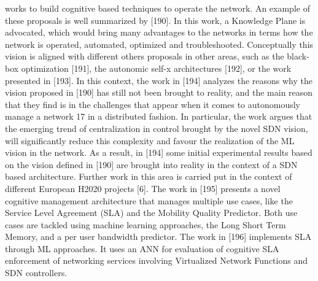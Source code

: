 \documentclass[12pt]{article}
\begin{document}
\begin{itemize}
	works to build cognitive based techniques to operate the
	network. An example of these proposals is well summarized
	by [190]. In this work, a Knowledge Plane is advocated, which
	would bring many advantages to the networks in terms how the
	network is operated, automated, optimized and troubleshooted.
	Conceptually this vision is aligned with different others proposals
	in other areas, such as the black-box optimization [191],
	the autonomic self-x architectures [192], or the work presented
	in [193]. In this context, the work in [194] analyzes the reasons
	why the vision proposed in [190] has still not been brought to
	reality, and the main reason that they find is in the challenges
	that appear when it comes to autonomously manage a network
	17
	in a distributed fashion. In particular, the work argues that
	the emerging trend of centralization in control brought by the
	novel SDN vision, will significantly reduce this complexity
	and favour the realization of the ML vision in the network.
	As a result, in [194] some initial experimental results based
	on the vision defined in [190] are brought into reality in the
	context of a SDN based architecture. Further work in this
	area is carried put in the context of different European H2020
	projects [6]. The work in [195] presents a novel cognitive
	management architecture that manages multiple use cases,
	like the Service Level Agreement (SLA) and the Mobility
	Quality Predictor. Both use cases are tackled using machine
	learning approaches, the Long Short Term Memory, and a per
	user bandwidth predictor. The work in [196] implements SLA
	through ML approaches. It uses an ANN for evaluation of
	cognitive SLA enforcement of networking services involving
	Virtualized Network Functions and SDN controllers.
	
\end{itemize}
\end{document}

